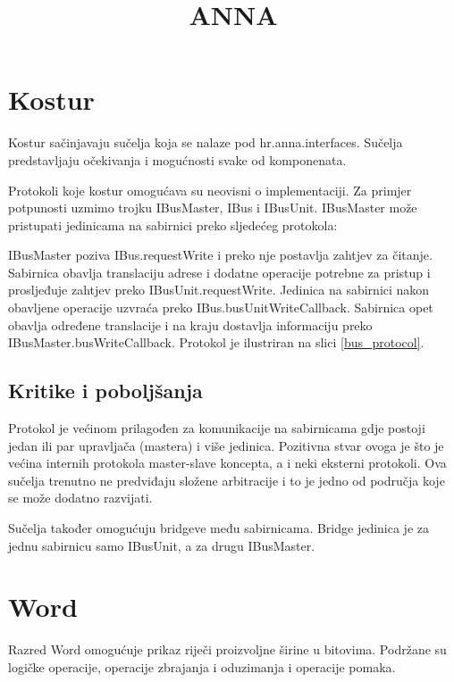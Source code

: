 \documentclass[a4paper]{article}
\begin{document}
  \title{ANNA}
  \maketitle

  \section{Kostur}
  Kostur sačinjavaju sučelja koja se nalaze pod
  hr.anna.interfaces. Sučelja predstavljaju očekivanja i mogućnosti
  svake od komponenata.

  Protokoli koje kostur omogućava su neovisni o implementaciji. Za
  primjer potpunosti uzmimo trojku IBusMaster, IBus i
  IBusUnit. IBusMaster može pristupati jedinicama na sabirnici preko
  sljedećeg protokola:

  IBusMaster poziva IBus.requestWrite i preko nje postavlja zahtjev za
  čitanje. Sabirnica obavlja translaciju adrese i dodatne operacije
  potrebne za pristup i prosljeđuje zahtjev preko
  IBusUnit.requestWrite. Jedinica na sabirnici nakon obavljene
  operacije uzvraća preko IBus.busUnitWriteCallback. Sabirnica opet
  obavlja određene translacije i na kraju dostavlja informaciju preko
  IBusMaster.busWriteCallback. Protokol je ilustriran na slici
  \ref{bus_protocol}.

  \subsection{Kritike i poboljšanja}
  Protokol je većinom prilagođen za komunikacije na sabirnicama gdje
  postoji jedan ili par upravljača (mastera) i više jedinica. Pozitivna
  stvar ovoga je što je većina internih protokola master-slave koncepta,
  a i neki eksterni protokoli. Ova sučelja trenutno ne predviđaju složene
  arbitracije i to je jedno od područja koje se može dodatno razvijati.

  Sučelja također omogućuju bridgeve među sabirnicama. Bridge jedinica
  je za jednu sabirnicu samo IBusUnit, a za drugu IBusMaster.


  

  \newpage

  \section{Word}
  Razred Word omogućuje prikaz riječi proizvoljne širine u bitovima.
  Podržane su logičke operacije, operacije zbrajanja i oduzimanja i
  operacije pomaka.
\end{document}
